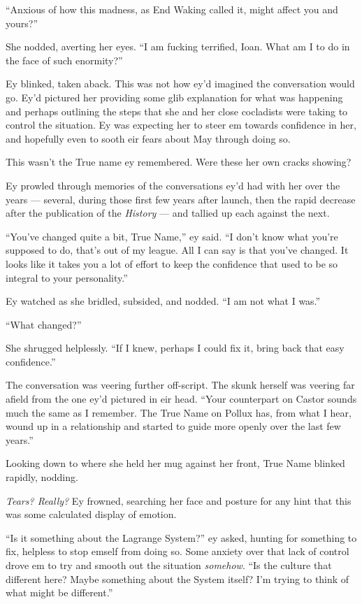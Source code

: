 ``Anxious of how this madness, as End Waking called it, might affect you and yours?''

She nodded, averting her eyes. ``I am fucking terrified, Ioan. What am I to do in the face of such enormity?''

Ey blinked, taken aback. This was not how ey'd imagined the conversation would go. Ey'd pictured her providing some glib explanation for what was happening and perhaps outlining the steps that she and her close cocladists were taking to control the situation. Ey was expecting her to steer em towards confidence in her, and hopefully even to sooth eir fears about May through doing so.

This wasn't the True name ey remembered. Were these her own cracks showing?

Ey prowled through memories of the conversations ey'd had with her over the years — several, during those first few years after launch, then the rapid decrease after the publication of the \emph{History} — and tallied up each against the next.

``You've changed quite a bit, True Name,'' ey said. ``I don't know what you're supposed to do, that's out of my league. All I can say is that you've changed. It looks like it takes you a lot of effort to keep the confidence that used to be so integral to your personality.''

Ey watched as she bridled, subsided, and nodded. ``I am not what I was.''

``What changed?''

She shrugged helplessly. ``If I knew, perhaps I could fix it, bring back that easy confidence.''

The conversation was veering further off-script. The skunk herself was veering far afield from the one ey'd pictured in eir head. ``Your counterpart on Castor sounds much the same as I remember. The True Name on Pollux has, from what I hear, wound up in a relationship and started to guide more openly over the last few years.''

Looking down to where she held her mug against her front, True Name blinked rapidly, nodding.

\emph{Tears? Really?} Ey frowned, searching her face and posture for any hint that this was some calculated display of emotion.

``Is it something about the Lagrange System?'' ey asked, hunting for something to fix, helpless to stop emself from doing so. Some anxiety over that lack of control drove em to try and smooth out the situation \emph{somehow}. ``Is the culture that different here? Maybe something about the System itself? I'm trying to think of what might be different.''

